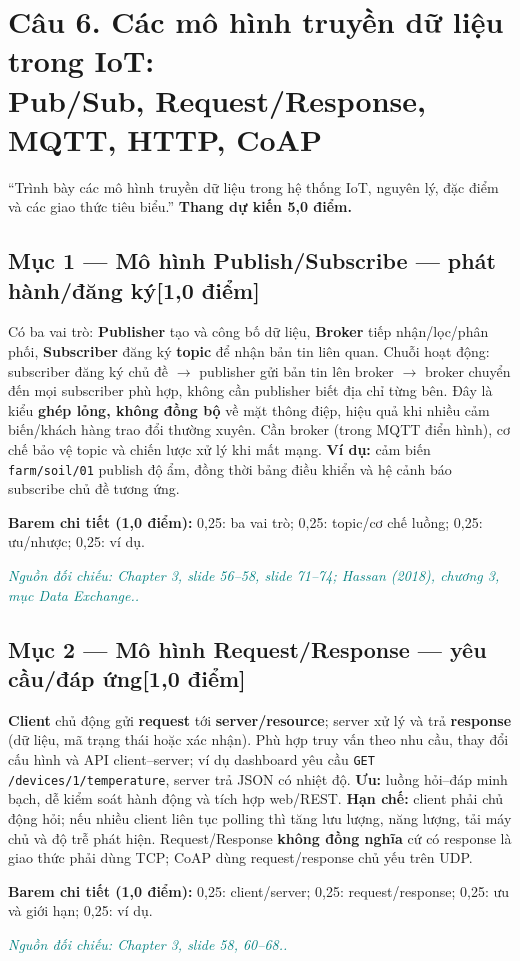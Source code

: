 \documentclass[11pt,a4paper]{article}
\newcommand{\pointpart}[2]{\subsection*{Mục #1 --- #2\hfill\normalsize\color{teal}[1,0 điểm]}}
\newcommand{\src}[1]{\par\noindent\textcolor{teal}{\footnotesize\textit{Nguồn đối chiếu: #1.}}\par}
\newcommand{\scoring}[1]{\par\noindent\textbf{Barem chi tiết (1,0 điểm):} #1\par}
\newcommand{\kw}[1]{\textbf{#1}}
\begin{document}
\clearpage
\section{Câu 6. Các mô hình truyền dữ liệu trong IoT:\texorpdfstring{\\}{ } Pub/Sub, Request/Response, MQTT, HTTP, CoAP}
\begin{questionbox}
``Trình bày các mô hình truyền dữ liệu trong hệ thống IoT, nguyên lý, đặc điểm và các giao thức tiêu biểu.'' \textbf{Thang dự kiến 5,0 điểm.}
\end{questionbox}
\pointpart{1}{Mô hình Publish/Subscribe --- phát hành/đăng ký}
Có ba vai trò: \kw{Publisher} tạo và công bố dữ liệu, \kw{Broker} tiếp nhận/lọc/phân phối, \kw{Subscriber} đăng ký \kw{topic} để nhận bản tin liên quan. Chuỗi hoạt động: subscriber đăng ký chủ đề $\rightarrow$ publisher gửi bản tin lên broker $\rightarrow$ broker chuyển đến mọi subscriber phù hợp, không cần publisher biết địa chỉ từng bên. Đây là kiểu \kw{ghép lỏng, không đồng bộ} về mặt thông điệp, hiệu quả khi nhiều cảm biến/khách hàng trao đổi thường xuyên. Cần broker (trong MQTT điển hình), cơ chế bảo vệ topic và chiến lược xử lý khi mất mạng. \kw{Ví dụ:} cảm biến \texttt{farm/soil/01} publish độ ẩm, đồng thời bảng điều khiển và hệ cảnh báo subscribe chủ đề tương ứng.
\scoring{0,25: ba vai trò; 0,25: topic/cơ chế luồng; 0,25: ưu/nhược; 0,25: ví dụ.}
\src{Chapter 3, slide 56--58, slide 71--74; Hassan (2018), chương 3, mục Data Exchange.}

\pointpart{2}{Mô hình Request/Response --- yêu cầu/đáp ứng}
\kw{Client} chủ động gửi \kw{request} tới \kw{server/resource}; server xử lý và trả \kw{response} (dữ liệu, mã trạng thái hoặc xác nhận). Phù hợp truy vấn theo nhu cầu, thay đổi cấu hình và API client--server; ví dụ dashboard yêu cầu \texttt{GET /devices/1/temperature}, server trả JSON có nhiệt độ. \kw{Ưu:} luồng hỏi--đáp minh bạch, dễ kiểm soát hành động và tích hợp web/REST. \kw{Hạn chế:} client phải chủ động hỏi; nếu nhiều client liên tục polling thì tăng lưu lượng, năng lượng, tải máy chủ và độ trễ phát hiện. Request/Response \kw{không đồng nghĩa} cứ có response là giao thức phải dùng TCP; CoAP dùng request/response chủ yếu trên UDP.
\scoring{0,25: client/server; 0,25: request/response; 0,25: ưu và giới hạn; 0,25: ví dụ.}
\src{Chapter 3, slide 58, 60--68.}
\end{document}
